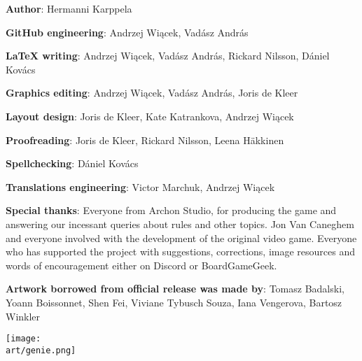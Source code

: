 
\bigbreak

\begin{multicols*}{2}

\textbf{Author}: Hermanni Karppela

\textbf{GitHub engineering}: Andrzej Wiącek, Vadász András

\textbf{LaTeX writing}: Andrzej Wiącek, Vadász András, Rickard Nilsson, Dániel Kovács

\textbf{Graphics editing}: Andrzej Wiącek, Vadász András, Joris de Kleer

\textbf{Layout design}: Joris de Kleer, Kate Katrankova, Andrzej Wiącek

\textbf{Proofreading}: Joris de Kleer, Rickard Nilsson, Leena Häkkinen

\textbf{Spellchecking}: Dániel Kovács

\textbf{Translations engineering}: Victor Marchuk, Andrzej Wiącek

\phantom{Translators placeholder}

\textbf{Special thanks}: Everyone from Archon Studio, for producing the game and answering our incessant queries about rules and other topics.
Jon Van Caneghem and everyone involved with the development of the original video game.
Everyone who has supported the project with suggestions, corrections, image resources and words of encouragement either on Discord or BoardGameGeek.

\textbf{Artwork borrowed from official release was made by}: Tomasz Badalski, Yoann Boissonnet, Shen Fei, Viviane Tybusch Souza, Iana Vengerova, Bartosz Winkler

\columnbreak

\vspace*{\fill}

\texttt{[image: \\art/genie.png]}

\vspace*{\fill}

\end{multicols*}
